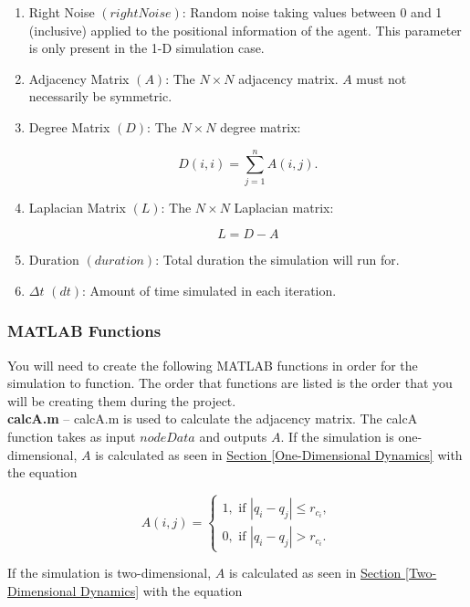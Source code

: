 \documentclass[../CourseManual.tex]{subfiles}
\begin{document}
\begin{enumerate}
    \item Right Noise $(rightNoise)$: Random noise taking values between 0 and 1 (inclusive) applied to the positional information of the agent.  This parameter is only present in the 1-D simulation case. 
    
    \item Adjacency Matrix $(A)$: The $N \times N$ adjacency matrix.  $A$ must not necessarily be symmetric. 
  
    \item Degree Matrix $(D)$: The $N \times N$ degree matrix:
    
    \[
    D(i,i) = \sum_{j=1}^{n}{A(i,j)}.
    \]
    
    
    \item Laplacian Matrix $(L)$: The $N \times N$ Laplacian matrix:
    
    $$L = D - A$$

    \item Duration $(duration)$: Total duration the simulation will run for.
    
    \item $\Delta t$ $(dt)$: Amount of time simulated in each iteration.
    
    
\end{enumerate}

\subsubsection{MATLAB Functions} \label{MATLAB Functions: Opinion}
You will need to create the following MATLAB functions in order for the simulation to function. The order that functions are listed is the order that you will be creating them during the project.\\

\textbf{calcA.m} -- calcA.m is used to calculate the adjacency matrix. The calcA function takes as input $nodeData$ and outputs $A$. If the simulation is one-dimensional, $A$ is calculated as seen in \hyperref[One-Dimensional Dynamics]{Section \ref{One-Dimensional Dynamics}} with the equation 

$$
A(i,j) = 
\begin{cases}
1, \text{ if } |q_i - q_j| \leq r_{c_i}, \\
0, \text{ if } |q_i - q_j| > r_{c_i}.
\end{cases}
$$

If the simulation is two-dimensional, $A$ is calculated as seen in \hyperref[Two-Dimensional Dynamics]{Section \ref{Two-Dimensional Dynamics}} with the equation 
\end{document}
